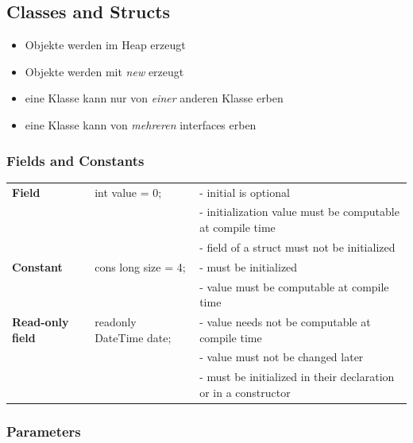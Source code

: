 \subsection{Classes and Structs}

\begin{itemize}
	\item Objekte werden im Heap erzeugt
	\item Objekte werden mit \textit{new} erzeugt
	\item eine Klasse kann nur von \textit{einer} anderen Klasse erben
	\item eine Klasse kann von \textit{mehreren} interfaces erben
\end{itemize}

\subsubsection{Fields and Constants}

\begin{tabular}{l|l|l}
	\textbf{Field}           & int value = 0;          & - initial is optional                                     \\
	                         &                         & - initialization value must be computable at compile time \\
	                         &                         & - field of a struct must not be initialized               \\ \hline
	\textbf{Constant}        & cons long size = 4;     & - must be initialized                                     \\
	                         &                         & - value must be computable at compile time                \\ \hline
	\textbf{Read-only field} & readonly DateTime date; & - value needs not be computable at compile time           \\
	                         &                         & - value must not be changed later \\
	                         &                         & - must be initialized in their declaration or in a constructor \\
\end{tabular} 

\subsubsection{Parameters}

